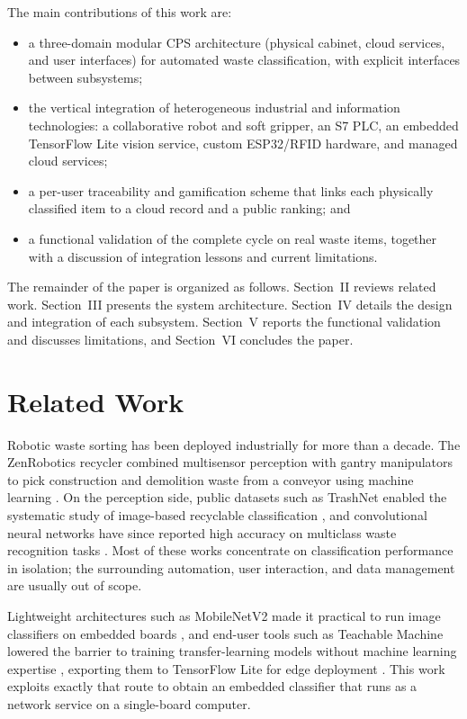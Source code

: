 \documentclass[conference]{IEEEtran}
\begin{document}
The main contributions of this work are:
\begin{itemize}
\item a three-domain modular CPS architecture (physical cabinet, cloud services, and user interfaces) for automated waste classification, with explicit interfaces between subsystems;
\item the vertical integration of heterogeneous industrial and information technologies: a collaborative robot and soft gripper, an S7 PLC, an embedded TensorFlow Lite vision service, custom ESP32/RFID hardware, and managed cloud services;
\item a per-user traceability and gamification scheme that links each physically classified item to a cloud record and a public ranking; and
\item a functional validation of the complete cycle on real waste items, together with a discussion of integration lessons and current limitations.
\end{itemize}

The remainder of the paper is organized as follows. Section~II reviews related work. Section~III presents the system architecture. Section~IV details the design and integration of each subsystem. Section~V reports the functional validation and discusses limitations, and Section~VI concludes the paper.

\section{Related Work}
Robotic waste sorting has been deployed industrially for more than a decade. The ZenRobotics recycler combined multisensor perception with gantry manipulators to pick construction and demolition waste from a conveyor using machine learning \cite{b4}. On the perception side, public datasets such as TrashNet enabled the systematic study of image-based recyclable classification \cite{b5}, and convolutional neural networks have since reported high accuracy on multiclass waste recognition tasks \cite{b6}. Most of these works concentrate on classification performance in isolation; the surrounding automation, user interaction, and data management are usually out of scope.

Lightweight architectures such as MobileNetV2 made it practical to run image classifiers on embedded boards \cite{b7}, and end-user tools such as Teachable Machine lowered the barrier to training transfer-learning models without machine learning expertise \cite{b8}, exporting them to TensorFlow Lite for edge deployment \cite{b9}. This work exploits exactly that route to obtain an embedded classifier that runs as a network service on a single-board computer.
\end{document}
